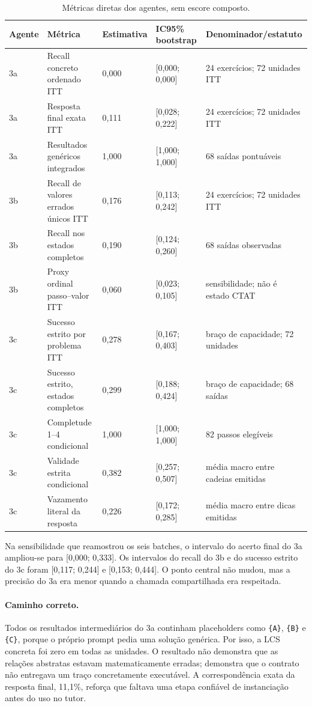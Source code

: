 \documentclass[11pt,a4paper]{article}
\newcommand{\ITT}{ITT}
\begin{document}
\begin{table}[H]
\centering
\caption{Métricas diretas dos agentes, sem escore composto.}
\label{tab:diretas}
\footnotesize
\setlength{\tabcolsep}{2pt}
\begin{tabularx}{\textwidth}{@{}C{1.05cm}Y C{1.65cm}C{1.75cm}P{3.45cm}@{}}
\toprule
Agente & Métrica & Estimativa & IC95\% bootstrap & Denominador/estatuto \\
\midrule
3a & Recall concreto ordenado \ITT{} & 0,000 & [0,000; 0,000] & 24 exercícios; 72 unidades \ITT{} \\
3a & Resposta final exata \ITT{} & 0,111 & [0,028; 0,222] & 24 exercícios; 72 unidades \ITT{} \\
3a & Resultados genéricos integrados & 1,000 & [1,000; 1,000] & 68 saídas pontuáveis \\
3b & Recall de valores errados únicos \ITT{} & 0,176 & [0,113; 0,242] & 24 exercícios; 72 unidades \ITT{} \\
3b & Recall nos estados completos & 0,190 & [0,124; 0,260] & 68 saídas observadas \\
3b & Proxy ordinal passo--valor \ITT{} & 0,060 & [0,023; 0,105] & sensibilidade; não é estado CTAT \\
3c & Sucesso estrito por problema \ITT{} & 0,278 & [0,167; 0,403] & braço de capacidade; 72 unidades \\
3c & Sucesso estrito, estados completos & 0,299 & [0,188; 0,424] & braço de capacidade; 68 saídas \\
3c & Completude 1--4 condicional & 1,000 & [1,000; 1,000] & 82 passos elegíveis \\
3c & Validade estrita condicional & 0,382 & [0,257; 0,507] & média macro entre cadeias emitidas \\
3c & Vazamento literal da resposta & 0,226 & [0,172; 0,285] & média macro entre dicas emitidas \\
\bottomrule
\end{tabularx}
\end{table}

Na sensibilidade que reamostrou os seis batches, o intervalo do acerto final do 3a ampliou-se para [0,000; 0,333]. Os intervalos do recall do 3b e do sucesso estrito do 3c foram [0,117; 0,244] e [0,153; 0,444]. O ponto central não mudou, mas a precisão do 3a era menor quando a chamada compartilhada era respeitada.

\paragraph{Caminho correto.} Todos os resultados intermediários do 3a continham placeholders como \texttt{\{A\}}, \texttt{\{B\}} e \texttt{\{C\}}, porque o próprio prompt pedia uma solução genérica. Por isso, a LCS concreta foi zero em todas as unidades. O resultado não demonstra que as relações abstratas estavam matematicamente erradas; demonstra que o contrato não entregava um traço concretamente executável. A correspondência exata da resposta final, 11,1\%, reforça que faltava uma etapa confiável de instanciação antes do uso no tutor.
\end{document}
